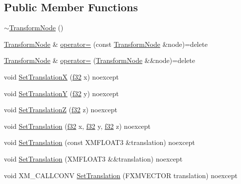 \subsection*{Public Member Functions}
\begin{DoxyCompactItemize}
\item 
\hyperlink{structmage_1_1_transform_node_a0c5e84d99c27cda31dae8106611d682f}{$\sim$\+Transform\+Node} ()
\item 
\hyperlink{structmage_1_1_transform_node}{Transform\+Node} \& \hyperlink{structmage_1_1_transform_node_afd5f7d7b377b1a85cbe1d64f8f0df49a}{operator=} (const \hyperlink{structmage_1_1_transform_node}{Transform\+Node} \&node)=delete
\item 
\hyperlink{structmage_1_1_transform_node}{Transform\+Node} \& \hyperlink{structmage_1_1_transform_node_a8dcd5a36ad95917216df628d309b294d}{operator=} (\hyperlink{structmage_1_1_transform_node}{Transform\+Node} \&\&node)=delete
\item 
void \hyperlink{structmage_1_1_transform_node_a3a39441db3db62f1d43e1d0c8e5f414b}{Set\+TranslationX} (\hyperlink{namespacemage_a6a44ad388483959dc4dff9f2aef91431}{f32} x) noexcept
\item 
void \hyperlink{structmage_1_1_transform_node_a63a4053865899238eccdae792371b673}{Set\+TranslationY} (\hyperlink{namespacemage_a6a44ad388483959dc4dff9f2aef91431}{f32} y) noexcept
\item 
void \hyperlink{structmage_1_1_transform_node_add41711dd9b72a791b7cb3b01e2f931f}{Set\+TranslationZ} (\hyperlink{namespacemage_a6a44ad388483959dc4dff9f2aef91431}{f32} z) noexcept
\item 
void \hyperlink{structmage_1_1_transform_node_adf52cfc8b3a8c008833b5413731514fa}{Set\+Translation} (\hyperlink{namespacemage_a6a44ad388483959dc4dff9f2aef91431}{f32} x, \hyperlink{namespacemage_a6a44ad388483959dc4dff9f2aef91431}{f32} y, \hyperlink{namespacemage_a6a44ad388483959dc4dff9f2aef91431}{f32} z) noexcept
\item 
void \hyperlink{structmage_1_1_transform_node_ae418bb44c86394c1590c7c6d6735027a}{Set\+Translation} (const X\+M\+F\+L\+O\+A\+T3 \&translation) noexcept
\item 
void \hyperlink{structmage_1_1_transform_node_af62e3d540778f236ba7b2fd914d369a6}{Set\+Translation} (X\+M\+F\+L\+O\+A\+T3 \&\&translation) noexcept
\item 
void X\+M\+\_\+\+C\+A\+L\+L\+C\+O\+NV \hyperlink{structmage_1_1_transform_node_a958f614a6a534d26ac1d3eab3bea5ccb}{Set\+Translation} (F\+X\+M\+V\+E\+C\+T\+OR translation) noexcept

\end{DoxyCompactItemize}
